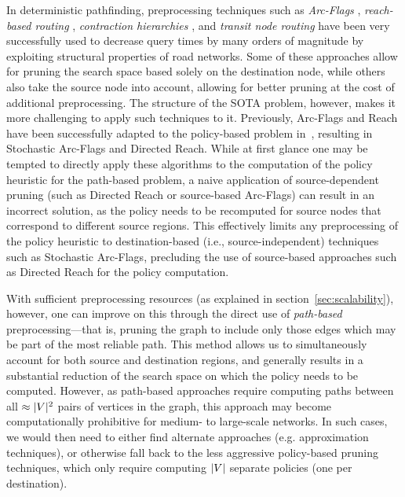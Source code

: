 \documentclass[oribibl]{llncs}
\DeclarePairedDelimiter{\abs}{\lvert}{\rvert}
\begin{document}
		In deterministic pathfinding, preprocessing techniques such as
		\textit{Arc-Flags} \citep{hilger2009fast},
		\textit{reach-based routing} \citep{gutman2004reach,goldberg2006reach},
		\textit{contraction hierarchies} \citep{geisberger2008contraction}, and
		\textit{transit node routing} \citep{bast2006transit}
		have been very successfully used to decrease query times by many orders of magnitude by exploiting
		structural properties of road networks.
		Some of these approaches allow for pruning the search space based solely on the destination node,
		while others also take the source node into account, allowing for better pruning at the cost of
		additional preprocessing. The structure of the SOTA problem, however, makes it more challenging to apply
		such techniques to it.
		Previously, Arc-Flags and Reach have been successfully adapted to the policy-based problem
		in~\citep*{sabran2014precomputation}, resulting in Stochastic Arc-Flags and Directed Reach.
		While at first glance one may be tempted to directly apply these algorithms to the computation of the
		policy heuristic for the path-based problem,
		a naive application of source-dependent pruning (such as Directed Reach or source-based Arc-Flags)
		can result in an incorrect solution,
		as the policy needs to be recomputed for source nodes that correspond to different source regions.
		This effectively limits any preprocessing of the policy heuristic to destination-based
		(i.e., source-independent) techniques such as Stochastic Arc-Flags, precluding the use of source-based
		approaches such as Directed Reach for the policy computation.

		With sufficient preprocessing resources (as explained in section~\ref{sec:scalability}),
		however, one can improve on this through the direct use of \textit{path-based} preprocessing---that is,
		pruning the graph to include only those edges which may be part of the most reliable path.
		This method allows us to simultaneously account for both source and destination regions, and generally
		results in a substantial reduction of the search space on which the policy needs to be computed.
		However, as path-based approaches require computing paths between all $\approx\abs{V}^2$ pairs of vertices
		in the graph, this approach may become computationally prohibitive for medium- to large-scale networks.
		In such cases, we would then need to either find alternate approaches (e.g. approximation techniques),
		or otherwise fall back to the less aggressive policy-based pruning techniques,
		which only require computing $\abs{V}$ separate policies (one per destination).
\end{document}
